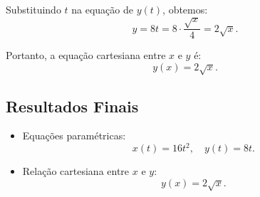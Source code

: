 Substituindo \(t\) na equação de \(y(t)\), obtemos:
\[
y = 8t = 8 \cdot \frac{\sqrt{x}}{4} = 2\sqrt{x}.
\]

Portanto, a equação cartesiana entre \(x\) e \(y\) é:
\[
y(x) = 2\sqrt{x}.
\]

\subsection*{Resultados Finais}
\begin{itemize}
    \item Equações paramétricas:
    \[
    x(t) = 16t^2, \quad y(t) = 8t.
    \]
    \item Relação cartesiana entre \(x\) e \(y\):
    \[
    y(x) = 2\sqrt{x}.
    \]
\end{itemize}
